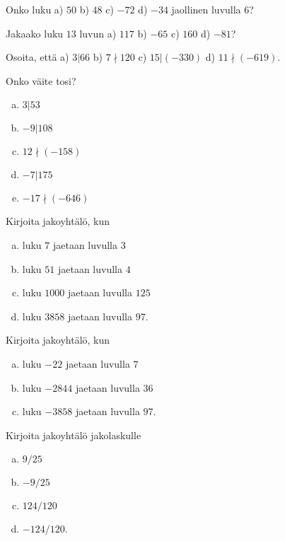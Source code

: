 \setcounter{tehtava}{0}

\begin{tehtavasivu}

\begin{tehtava}
	Onko luku a) $50$ b) $48$ c) $-72$ d) $-34$ jaollinen luvulla $6$?
\end{tehtava}

\begin{tehtava}
	Jakaako luku $13$ luvun a) $117$ b) $-65$ c) $160$ d) $-81$?
\end{tehtava}

\begin{tehtava}
	Osoita, että a) $3|66$ b) $7\nmid 120$ c) $15|(-330)$ d) $11\nmid (-619)$.
\end{tehtava}

\begin{tehtava}
	Onko väite tosi?
	\begin{enumerate}[a)]
	\item $3|53$
	\item $-9|108$
	\item $12 \nmid (-158)$
	\item $-7|175$
	\item $-17 \nmid (-646)$
	\end{enumerate}
\end{tehtava}

\begin{tehtava}
	Kirjoita jakoyhtälö, kun
	\begin{enumerate}[a)]
	\item luku $7$ jaetaan luvulla $3$
	\item luku $51$ jaetaan luvulla $4$
	\item luku $1000$ jaetaan luvulla $125$
	\item luku $3858$ jaetaan luvulla $97$.
	\end{enumerate}
\end{tehtava}

\begin{tehtava}
	Kirjoita jakoyhtälö, kun
	\begin{enumerate}[a)]
	\item luku $-22$ jaetaan luvulla $7$
	\item luku $-2844$ jaetaan luvulla $36$
	\item luku $-3858$ jaetaan luvulla $97$.
	\end{enumerate}
\end{tehtava}

\begin{tehtava}
	Kirjoita jakoyhtälö jakolaskulle
	\begin{enumerate}[a)]
	\item $9/25$
	\item $-9/25$
	\item $124/120$
	\item $-124/120$.
	\end{enumerate}
\end{tehtava}


\end{tehtavasivu}
